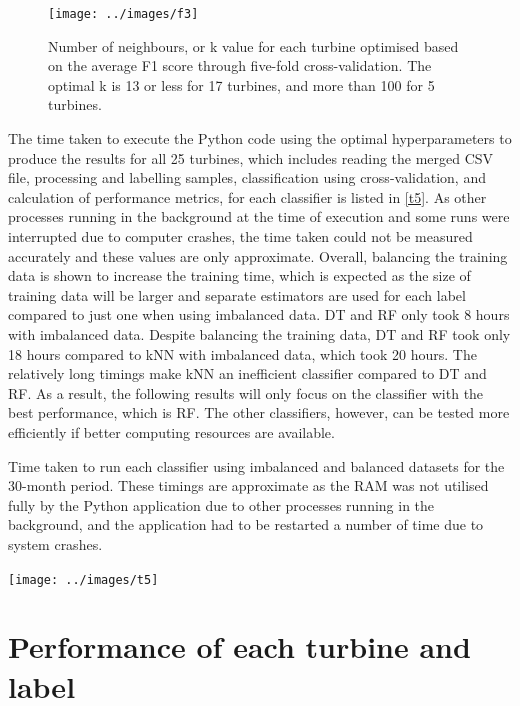 \begin{figure}
  \centering
  \texttt{[image: ../images/f3]}
  \caption{\label{f3}Number of neighbours, or k value for each turbine optimised based on the average F1 score through five-fold cross-validation. The optimal k is 13 or less for 17 turbines, and more than 100 for 5 turbines.}
\end{figure}

The time taken to execute the Python code using the optimal hyperparameters to produce the results for all 25 turbines, which includes reading the merged CSV file, processing and labelling samples, classification using cross-validation, and calculation of performance metrics, for each classifier is listed in \autoref{t5}. As other processes running in the background at the time of execution and some runs were interrupted due to computer crashes, the time taken could not be measured accurately and these values are only approximate. Overall, balancing the training data is shown to increase the training time, which is expected as the size of training data will be larger and separate estimators are used for each label compared to just one when using imbalanced data. DT and RF only took 8 hours with imbalanced data. Despite balancing the training data, DT and RF took only 18 hours compared to kNN with imbalanced data, which took 20 hours. The relatively long timings make kNN an inefficient classifier compared to DT and RF. As a result, the following results will only focus on the classifier with the best performance, which is RF. The other classifiers, however, can be tested more efficiently if better computing resources are available.

\begin{table}
  \centering
  \caption{\label{t5}Time taken to run each classifier using imbalanced and balanced datasets for the 30-month period. These timings are approximate as the RAM was not utilised fully by the Python application due to other processes running in the background, and the application had to be restarted a number of time due to system crashes.}
  \texttt{[image: ../images/t5]}
\end{table}

\section{Performance of each turbine and label}

